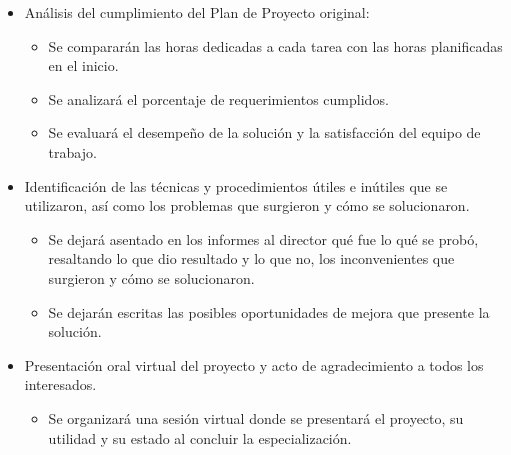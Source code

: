 \documentclass[
11pt, %
]{charter}
\begin{document}
\begin{itemize}
	\item Análisis del cumplimiento del Plan de Proyecto original:
		\begin{itemize}
			\item Se compararán las horas dedicadas a cada tarea con las horas planificadas en el inicio.
			\item Se analizará el porcentaje de requerimientos cumplidos.
			\item Se evaluará el desempeño de la solución y la satisfacción del equipo de trabajo. 
		\end{itemize}
	\item Identificación de las técnicas y procedimientos útiles e inútiles que se utilizaron, así como los problemas que surgieron y cómo se solucionaron.
		\begin{itemize}
			\item Se dejará asentado en los informes al director qué fue lo qué se probó, resaltando lo que dio resultado y lo que no, los inconvenientes que surgieron y cómo se solucionaron. 
			\item Se dejarán escritas las posibles oportunidades de mejora que presente la solución.
		\end{itemize}
	\item Presentación oral virtual del proyecto y acto de agradecimiento a todos los interesados.
	\begin{itemize}
			\item Se organizará una sesión virtual donde se presentará el proyecto, su utilidad y su estado al concluir la especialización.
		\end{itemize}
\end{itemize}
\end{document}
